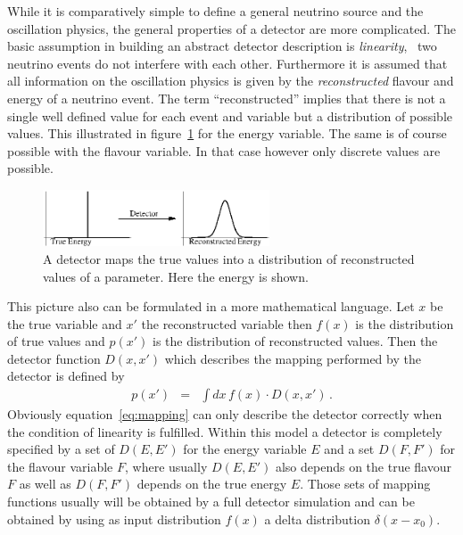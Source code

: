 While
it is comparatively simple to define a general neutrino source 
and the oscillation physics, the general properties of a detector are more
complicated. The basic assumption in building an abstract detector description
is \emph{linearity}, \ie\ two neutrino events do not interfere with each other.
Furthermore it is assumed that all information on the oscillation physics 
is given by the \emph{reconstructed} flavour and energy of a 
neutrino event. The term ``reconstructed'' implies that there is not a single
well defined value for each event and variable but a distribution of possible
values. This illustrated in figure~\ref{fig:distro} for the energy variable.
The same is of course possible with the flavour variable. In that case however
only discrete values are possible.
%
\begin{figure}[h!]
\begin{center}
\includegraphics[width=0.6\textwidth]{mapping}
\end{center}
\caption{\label{fig:distro} A detector maps the true values into
a distribution of reconstructed values of a parameter. Here the energy is 
shown.}
\end{figure}
% 

This picture also can be formulated in a more mathematical language. Let $x$
be the true variable and $x'$ the reconstructed variable then $f(x)$ is the
distribution of true values and $p(x')$ is the distribution of reconstructed
values. Then the detector function  $D(x,x')$ which describes 
the mapping performed by the detector is defined by
\begin{eqnarray}
\label{eq:mapping}
p(x')&=&\int dx\, f(x)\cdot D(x,x')\,.
\end{eqnarray}
Obviously equation~\ref{eq:mapping} can only describe the detector correctly
when the condition of linearity is fulfilled. Within this model a detector
is completely specified by a set of $D(E,E')$ for the energy variable $E$
and a set $D(F,F')$ for the flavour variable $F$, where usually $D(E,E')$ also
depends on the true flavour $F$ as well as $D(F,F')$ depends on the true energy
$E$. Those sets of mapping functions usually will be obtained by a 
full detector simulation and can be obtained by using as input 
distribution $f(x)$ a delta distribution $\delta(x-x_0)$.

